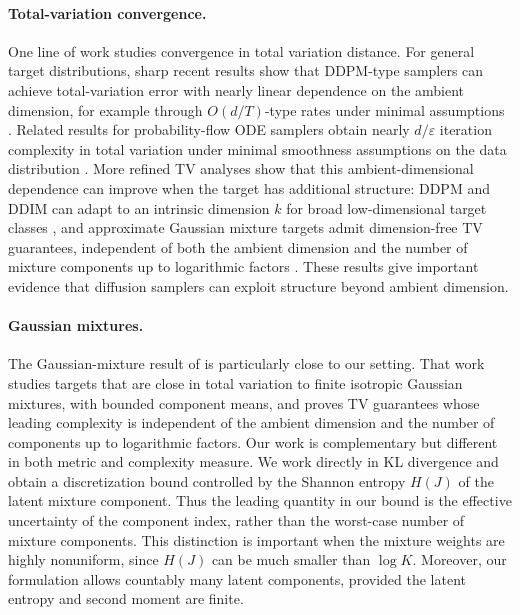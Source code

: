 \documentclass[11pt]{article}
\begin{document}
\paragraph{Total-variation convergence.}
One line of work studies convergence in total variation distance. For general
target distributions, sharp recent results show that DDPM-type samplers can
achieve total-variation error with nearly linear dependence on the ambient
dimension, for example through $O(d/T)$-type rates under minimal assumptions
\cite{li2025odt}. Related results for probability-flow ODE samplers obtain
nearly $d/\varepsilon$ iteration complexity in total variation under minimal
smoothness assumptions on the data distribution \cite{li2024sharp}. More
refined TV analyses show that this ambient-dimensional dependence can improve
when the target has additional structure: DDPM and DDIM can adapt to an
intrinsic dimension $k$ for broad low-dimensional target classes
\cite{liang2025low}, and approximate Gaussian mixture targets admit
dimension-free TV guarantees, independent of both the ambient dimension and
the number of mixture components up to logarithmic factors
\cite{li2025dimension}. These results give important evidence that diffusion
samplers can exploit structure beyond ambient dimension.

\paragraph{Gaussian mixtures.}
The Gaussian-mixture result of \cite{li2025dimension} is particularly close
to our setting. That work studies targets that are close in total variation to
finite isotropic Gaussian mixtures, with bounded component means, and proves
TV guarantees whose leading complexity is independent of the ambient dimension
and the number of components up to logarithmic factors. Our work is
complementary but different in both metric and complexity measure. We work
directly in KL divergence and obtain a discretization bound controlled by the
Shannon entropy $H(J)$ of the latent mixture component. Thus the leading
quantity in our bound is the effective uncertainty of the component index,
rather than the worst-case number of mixture components. This distinction is
important when the mixture weights are highly nonuniform, since $H(J)$ can be
much smaller than $\log K$. Moreover, our formulation allows countably many
latent components, provided the latent entropy and second moment are finite.
\end{document}
